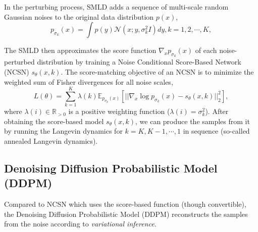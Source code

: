 \documentclass{article} %
\begin{document}
In the perturbing process, SMLD adds a sequence of multi-scale random Gaussian noises to the original data distribution $p(x)$,
\begin{equation}
    p_{\sigma_k}(x)=\int p(y) \mathcal{N}(x; y, \sigma_k^2 I) dy, k=1, 2, \cdots, K,
\end{equation}

The SMLD then approximates the score function $\nabla_x p_{\sigma_k}(x)$ of each noise-perturbed distribution by training a Noise Conditional Score-Based Network (NCSN) $s_\theta(x, k)$. The score-matching objective of an NCSN is to minimize the weighted sum of Fisher divergences for all noise scales,
\begin{equation} \label{equ:score_matching}
    L(\theta)=\sum_{k=1}^K \lambda(k) \mathbb{E}_{p_{\sigma_k}(x)}[||\nabla_x \log p_{\sigma_k}(x) - s_\theta(x, k)||_2^2],
\end{equation}
where $\lambda(i)\in \mathbb{R}_{>0}$ is a positive weighting function ($\lambda(i)=\sigma_k^2$). After obtaining the score-based model $s_\theta(x, k)$, we can produce the samples from it by running the Langevin dynamics for $k=K, K-1, \cdots, 1$ in sequence (so-called annealed Langevin dynamics).

\subsection{Denoising Diffusion Probabilistic Model (DDPM)}

Compared to NCSN which uses the score-based function (though convertible), the Denoising Diffusion Probabilistic Model (DDPM) reconstructs the samples from the noise according to \textit{variational inference}. 
\end{document}
